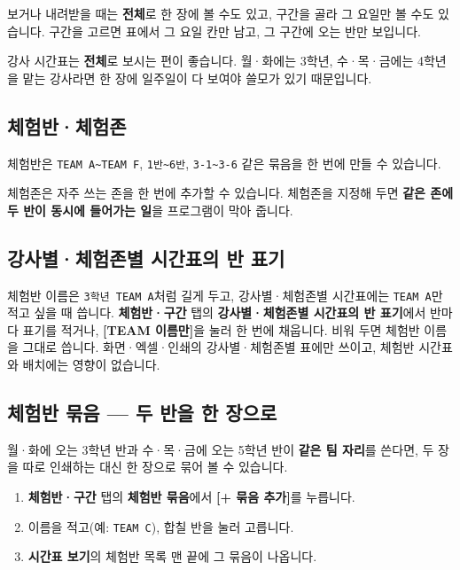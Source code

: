 \documentclass[11pt,a4paper]{article}
\newcommand{\btn}[1]{\textcolor{ttdark}{\sffamily\bfseries[#1]}}   %
\newcommand{\tab}[1]{\textcolor{ttblue}{\sffamily\bfseries#1}}      %
\newcommand{\code}[1]{\texttt{\small #1}}
\begin{document}
보거나 내려받을 때는 \textbf{전체}로 한 장에 볼 수도 있고, 구간을 골라 그 요일만 볼 수도 있습니다.
구간을 고르면 표에서 그 요일 칸만 남고, 그 구간에 오는 반만 보입니다.

\begin{tip}
강사 시간표는 \textbf{전체}로 보시는 편이 좋습니다. 월·화에는 3학년, 수·목·금에는 4학년을 맡는 강사라면
한 장에 일주일이 다 보여야 쓸모가 있기 때문입니다.
\end{tip}

\subsection{체험반·체험존}

체험반은 \code{TEAM A\textasciitilde TEAM F}, \code{1반\textasciitilde 6반}, \code{3-1\textasciitilde 3-6} 같은 묶음을 한 번에 만들 수 있습니다.

체험존은 자주 쓰는 존을 한 번에 추가할 수 있습니다. 체험존을 지정해 두면 \textbf{같은 존에 두 반이 동시에 들어가는 일}을 프로그램이 막아 줍니다.

\subsection{강사별·체험존별 시간표의 반 표기}

체험반 이름은 \code{3학년 TEAM A}처럼 길게 두고, 강사별·체험존별 시간표에는 \code{TEAM A}만 적고 싶을 때 씁니다.
\tab{체험반·구간} 탭의 \tab{강사별·체험존별 시간표의 반 표기}에서 반마다 표기를 적거나,
\btn{TEAM 이름만}을 눌러 한 번에 채웁니다. 비워 두면 체험반 이름을 그대로 씁니다.
화면·엑셀·인쇄의 강사별·체험존별 표에만 쓰이고, 체험반 시간표와 배치에는 영향이 없습니다.

\subsection{체험반 묶음 --- 두 반을 한 장으로}\label{sec:group}

월·화에 오는 3학년 반과 수·목·금에 오는 5학년 반이 \textbf{같은 팀 자리}를 쓴다면,
두 장을 따로 인쇄하는 대신 한 장으로 묶어 볼 수 있습니다.

\begin{enumerate}
  \item \tab{체험반·구간} 탭의 \tab{체험반 묶음}에서 \btn{+ 묶음 추가}를 누릅니다.
  \item 이름을 적고(예: \code{TEAM C}), 합칠 반을 눌러 고릅니다.
  \item \tab{시간표 보기}의 체험반 목록 맨 끝에 그 묶음이 나옵니다.
\end{enumerate}
\end{document}
